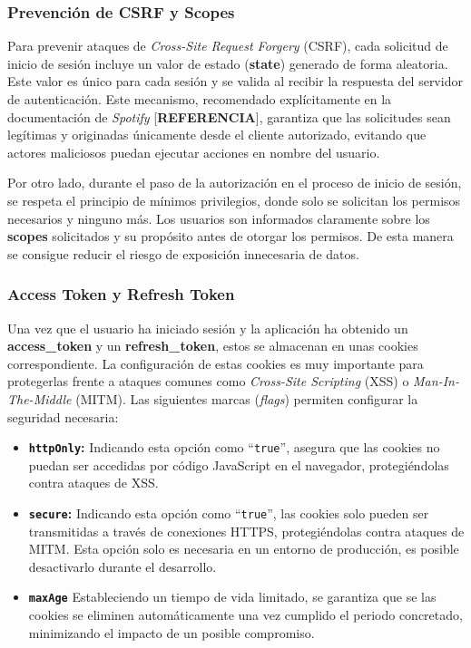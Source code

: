 \subsubsection*{Prevención de CSRF y Scopes}

Para prevenir ataques de \textit{Cross-Site Request Forgery} (CSRF), cada solicitud de inicio de sesión incluye un valor de estado (\textbf{state}) generado de forma aleatoria. Este valor es único para cada sesión y se valida al recibir la respuesta del servidor de autenticación. Este mecanismo, recomendado explícitamente en la documentación de \textit{Spotify} [\textbf{REFERENCIA}], garantiza que las solicitudes sean legítimas y originadas únicamente desde el cliente autorizado, evitando que actores maliciosos puedan ejecutar acciones en nombre del usuario.

Por otro lado, durante el paso de la autorización en el proceso de inicio de sesión, se respeta el principio de mínimos privilegios, donde solo se solicitan los permisos necesarios y ninguno más. Los usuarios son informados claramente sobre los \textbf{scopes} solicitados y su propósito antes de otorgar los permisos. De esta manera se consigue reducir el riesgo de exposición innecesaria de datos.

\subsubsection*{Access Token y Refresh Token}

Una vez que el usuario ha iniciado sesión y la aplicación ha obtenido un \textbf{access\_token} y un \textbf{refresh\_token}, estos se almacenan en unas cookies correspondiente. La configuración de estas cookies es muy importante para protegerlas frente a ataques comunes como \textit{Cross-Site Scripting} (XSS) o \textit{Man-In-The-Middle} (MITM). Las siguientes marcas (\textit{flags}) permiten configurar la seguridad necesaria:

\begin{itemize}
    \item \textbf{\texttt{httpOnly}:} Indicando esta opción como ``\texttt{true}'', asegura que las cookies no puedan ser accedidas por código JavaScript en el navegador, protegiéndolas contra ataques de XSS.
    \item \textbf{\texttt{secure}:} Indicando esta opción como ``\texttt{true}'', las cookies solo pueden ser transmitidas a través de conexiones HTTPS, protegiéndolas contra ataques de MITM. Esta opción solo es necesaria en un entorno de producción, es posible desactivarlo durante el desarrollo.
    \item \textbf{\texttt{maxAge}} Estableciendo un tiempo de vida limitado, se garantiza que se las cookies se eliminen automáticamente una vez cumplido el periodo concretado, minimizando el impacto de un posible compromiso.
\end{itemize}

